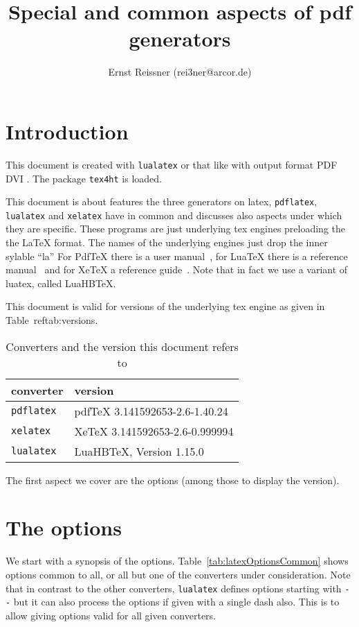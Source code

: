 \documentclass{article}
\title{Special and common aspects of pdf generators }
\author{Ernst Reissner (rei3ner@arcor.de)}
\date{}
\newcommand{\pdflatex}{\texttt{pdflatex}}
\newcommand{\lualatex}{\texttt{lualatex}}
\newcommand{\xelatex}{\texttt{xelatex}}
\begin{document}
\maketitle
\tableofcontents
\listoftables

\section{Introduction}

This document is created with \lualatex{} or that like 
with output format 
\ifpdf%
PDF%
\else
DVI%
\fi.
The package \texttt{tex4ht} 
is  loaded. 

This document is about features the three generators on latex, 
\pdflatex, \lualatex{} and \xelatex{} have in common 
and discusses also aspects under which they are specific. 
These programs are just underlying tex engines preloading the the \LaTeX{} format. 
The names of the underlying engines just drop the inner sylable "`la"' 
For PdfTeX there is a user manual~\cite{PdfTexUsr}, 
for LuaTeX there is a reference manual~\cite{LuaTexRef} and 
for XeTeX a reference guide~\cite{XeTexRef}. 
Note that in fact we use a variant of luatex, called LuaHBTeX. 

This document is valid for versions of the underlying tex engine 
as given in Table~ref{tab:versions}. 


\begin{longtable}{|ll|}
  \toprule
  converter & version \\
  \midrule
  \midrule
  \endfirsthead%
  \bottomrule
  \caption{\label{tab:versions} Converters and the version this document refers to }
  \endlastfoot%
  \pdflatex{}  & pdfTeX 3.141592653-2.6-1.40.24 \\
  \xelatex{}   & XeTeX 3.141592653-2.6-0.999994 \\
  \lualatex{}  & LuaHBTeX, Version 1.15.0 \\
\end{longtable}

The first aspect we cover are the options (among those to display the version). 

\section{The options}\label{sec:options}

We start with a synopsis of the options. 
Table~\ref{tab:latexOptionsCommon} shows options common to all, 
or all but one of the converters under consideration. 
Note that in contrast to the other converters, 
\lualatex{} defines options starting with \texttt{-{}-} 
but it can also process the options if given with a single dash also. 
This is to allow giving options valid for all given converters. 
\end{document}
